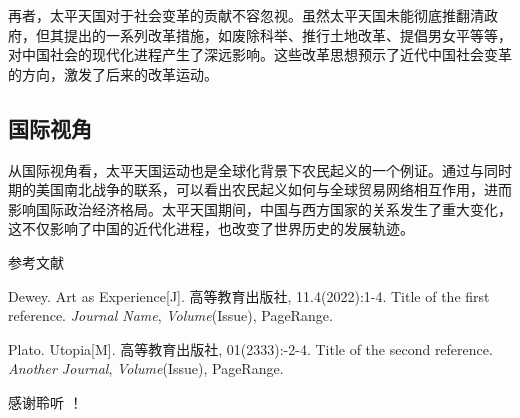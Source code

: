 \documentclass[10pt,a4paper]{beamer} %
\begin{document}
	\begin{frame}
		再者，太平天国对于社会变革的贡献不容忽视。虽然太平天国未能彻底推翻清政府，但其提出的一系列改革措施，如废除科举、推行土地改革、提倡男女平等等，对中国社会的现代化进程产生了深远影响。这些改革思想预示了近代中国社会变革的方向，激发了后来的改革运动。
	\end{frame}
	\subsection{国际视角}
	\begin{frame}
		从国际视角看，太平天国运动也是全球化背景下农民起义的一个例证。通过与同时期的美国南北战争的联系，可以看出农民起义如何与全球贸易网络相互作用，进而影响国际政治经济格局。太平天国期间，中国与西方国家的关系发生了重大变化，这不仅影响了中国的近代化进程，也改变了世界历史的发展轨迹。
	\end{frame}
	
	
	\appendix
	\begin{frame}{参考文献}
		\begin{thebibliography}{99} %
			Dewey. Art as Experience[J]. 高等教育出版社, 11.4(2022):1-4.
			\newblock Title of the first reference.
			\newblock \emph{Journal Name}, \emph{Volume}(Issue), PageRange.
			
			Plato. Utopia[M]. 高等教育出版社, 01(2333):-2-4.
			\newblock Title of the second reference.
			\newblock \emph{Another Journal}, \emph{Volume}(Issue), PageRange.
		\end{thebibliography}
		
		
	\end{frame}
	
	\begin{frame}[plain,c]
		\begin{center}
			\Huge 感谢聆听 ！
		\end{center}
	\end{frame}
	
\end{document}
